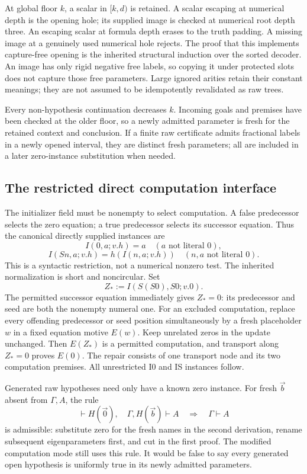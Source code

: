 At global floor $k$, a scalar in $[k,d)$ is retained. A scalar escaping
at numerical depth is the opening hole; its supplied image is checked at
numerical root depth three. An escaping scalar at formula depth erases
to the truth padding. A missing image at a genuinely used numerical
hole rejects. The proof that this implements capture-free opening is the
inherited structural induction over the sorted decoder. An image has
only rigid negative free labels, so copying it under protected slots
does not capture those free parameters. Large ignored arities retain
their constant meanings; they are not assumed to be idempotently
revalidated as raw trees.

Every non-hypothesis continuation decreases $k$. Incoming goals and
premises have been checked at the older floor, so a newly admitted
parameter is fresh for the retained context and conclusion. If a finite
raw certificate admits fractional labels in a newly opened interval,
they are distinct fresh parameters; all are included in a later
zero-instance substitution when needed.

\subsection{The restricted direct computation interface}
The initializer field must be nonempty to select computation. A false
predecessor selects the zero equation; a true predecessor selects its
successor equation. Thus the canonical directly supplied instances are
\[
 I(0,a;v.h)=a\quad(a\text{ not literal }0),
\]
\[
 I(Sn,a;v.h)=h(I(n,a;v.h))
 \quad(n,a\text{ not literal }0).
\]
This is a syntactic restriction, not a numerical nonzero test. The
inherited normalization is short and noncircular. Set
\[
 Z_*:=I(S(S0),S0;v.0).
\]
The permitted successor equation immediately gives $Z_*=0$: its
predecessor and seed are both the nonempty numeral one. For an excluded
computation, replace every offending predecessor or seed position
simultaneously by a fresh placeholder $w$ in a fixed equation motive
$E(w)$. Keep unrelated zeros in the update unchanged. Then $E(Z_*)$ is
a permitted computation, and transport along $Z_*=0$ proves $E(0)$.
The repair consists of one transport node and its two computation
premises. All unrestricted I0 and IS instances follow.\cite{certified}

Generated raw hypotheses need only have a known zero instance. For
fresh $\vec b$ absent from $\Gamma,A$, the rule
\[
 \vdash H(\vec0),\quad\Gamma,H(\vec b)\vdash A
 \quad\Longrightarrow\quad\Gamma\vdash A
\]
is admissible: substitute zero for the fresh names in the second
derivation, rename subsequent eigenparameters first, and cut in the
first proof. The modified computation mode still uses this rule.
It would be false to say every generated open hypothesis is uniformly
true in its newly admitted parameters.


